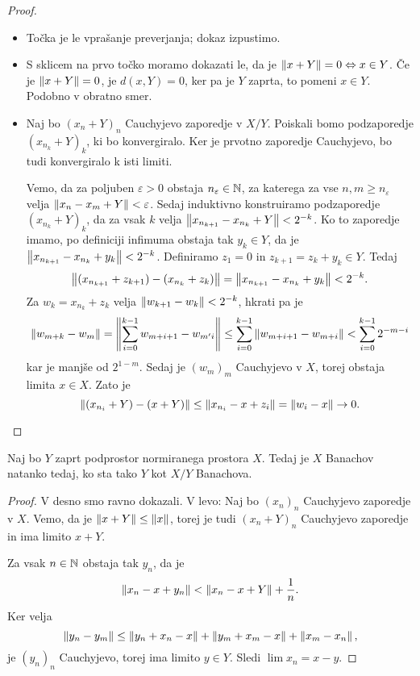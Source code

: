 \begin{proof} \hfill
  \begin{itemize}
  \item Točka je le vprašanje preverjanja; dokaz izpustimo.
  \item S sklicem na prvo točko moramo dokazati le, da je $\left\lVert x + Y\right\rVert = 0 \Leftrightarrow
	x \in Y$.
	Če je $\left\lVert x + Y\right\rVert = 0$, je $d(x, Y) = 0$, ker pa je $Y$ zaprta, to pomeni
	$x \in Y$.
	Podobno v obratno smer.

  \item Naj bo $(x_n + Y)_n$ Cauchyjevo zaporedje v $X/Y$.
	Poiskali bomo podzaporedje $(x_{n_k} + Y)_k$, ki bo konvergiralo.
	Ker je prvotno zaporedje Cauchyjevo, bo tudi konvergiralo k isti limiti.

	Vemo, da za poljuben $\varepsilon > 0$ obstaja $n_\varepsilon \in \mathbb{N}$, za
	katerega za vse $n, m \ge n_\varepsilon$ velja $\left\lVert x_n - x_m + Y\right\rVert <
	\varepsilon$.
	Sedaj induktivno konstruiramo podzaporedje $(x_{n_k} + Y)_k$, da za vsak $k$
	velja $\left\lVert x_{n_{k+1}} -x_{n_k} + Y\right\rVert < 2^{-k}$.
	Ko to zaporedje imamo, po definiciji infimuma obstaja tak $y_k \in Y$, da je
	$\left\lVert x_{n_{k+1}} - x_{n_k} + y_k\right\rVert < 2^{-k}$.
	Definiramo $z_1 = 0$ in $z_{k+1} = z_k + y_k \in Y$.
	Tedaj
	\[
	  \left\lVert(x_{n_{k+1}} + z_{k+1}) - (x_{n_k} + z_k)\right\rVert = \left\lVert x_{n_{k+1}} -
		x_{n_k} + y_k\right\rVert < 2^{-k}.
	\]
	Za $w_k = x_{n_k} + z_k$ velja $\left\lVert w_{k+1} - w_k\right\rVert < 2^{-k}$, hkrati pa je
	\[
	  \left\lVert w_{m+k} - w_m\right\rVert = \left\lVert\sum_{i=0}^{k-1} w_{m+i+1} - w_{m'i}\right\rVert
	  \le \sum_{i=0}^{k-1} \left\lVert w_{m+i+1} - w_{m+i}\right\rVert
	  < \sum_{i=0}^{k-1} 2^{-m-i}
	\]
	kar je manjše od $2^{1-m}$.
	Sedaj je $(w_m)_m$ Cauchyjevo v $X$, torej obstaja limita $x \in X$.
	Zato je
	\[
	  \left\lVert(x_{n_i} + Y) - (x + Y)\right\rVert \le \left\lVert x_{n_i} - x + z_i\right\rVert
	  = \left\lVert w_i - x\right\rVert \to 0.
	  \qedhere
	\]
  \end{itemize}
\end{proof}


\begin{trditev}
  Naj bo $Y$ zaprt podprostor normiranega prostora $X$.
  Tedaj je $X$ Banachov natanko tedaj, ko sta tako $Y$ kot $X/Y$ Banachova.
\end{trditev}

\begin{proof}
  V desno smo ravno dokazali.
  V levo:
  Naj bo $(x_n)_n$ Cauchyjevo zaporedje v $X$.
  Vemo, da je $\left\lVert x + Y\right\rVert \le \left\lVert x\right\rVert$, torej je tudi $(x_n + Y)_n$
  Cauchyjevo zaporedje in ima limito $x + Y$.

  Za vsak $n \in \mathbb{N}$ obstaja tak $y_n$, da je
  \[
	\left\lVert x_n - x + y_n\right\rVert < \left\lVert x_n - x + Y\right\rVert + \frac{1}{n}.
  \]
  Ker velja
  \[
	\left\lVert y_n - y_m\right\rVert \le \left\lVert y_n + x_n - x\right\rVert + \left\lVert y_m + x_m - x\right\rVert + \left\lVert x_m
	- x_n\right\rVert,
  \]
  je $(y_n)_n$ Cauchyjevo, torej ima limito $y \in Y$.
  Sledi $\lim x_n = x - y$.
\end{proof}

